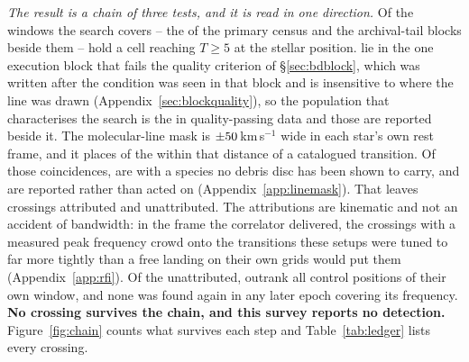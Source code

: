 \emph{The result is a chain of three tests, and it is read in one direction.}
Of the windows the search covers -- the \NWindows{} of the primary census
and the archival-tail blocks beside them -- \EvNCrossRaw{} hold a cell
reaching $T\geq5$ at the stellar position. \EvNCrossFlag{} lie in the one
execution block that fails the quality criterion of \S\ref{sec:bdblock}, which
was written after the condition was seen in that block and is insensitive to
where the line was drawn (Appendix~\ref{sec:blockquality}), so the population
that characterises the search is the \EvNCrossQp{} in quality-passing data and
those \EvNCrossFlag{} are reported beside it. The molecular-line mask is $\pm50$\,km\,s$^{-1}$ wide in each
star's own rest frame, and it places \MkNCoinc{} of the \EvNCrossQp{} within
that distance of a catalogued transition. Of those coincidences, \MkNSODecideWord{} are with a species no debris disc
has been shown to carry, and are reported rather than acted on
(Appendix~\ref{app:linemask}). That leaves
\EvNAttrQp{} crossings attributed and \EvNUnattrQp{} unattributed. The attributions are kinematic and not an accident of bandwidth: in the
frame the correlator delivered, the crossings with a measured peak frequency
crowd onto the transitions these setups were tuned to far more tightly than a
free landing on their own grids would put them (Appendix~\ref{app:rfi}). Of the unattributed,
\EvNRankQp{} outrank all \NCtrl{} control positions of their own window, and
none was found again in any later epoch covering its frequency. \textbf{No
crossing survives the chain, and this survey reports no detection.}
Figure~\ref{fig:chain} counts what survives each step and
Table~\ref{tab:ledger} lists every crossing.

